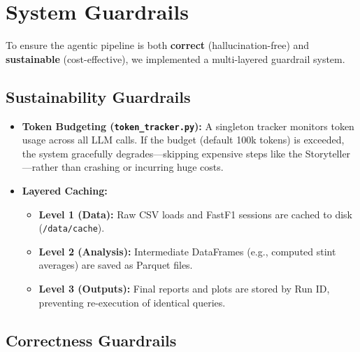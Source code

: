 \documentclass[11pt]{article}
\begin{document}
\section{System Guardrails}
\label{sec:guardrails}

To ensure the agentic pipeline is both \textbf{correct} (hallucination-free) and \textbf{sustainable} (cost-effective), we implemented a multi-layered guardrail system.

\subsection{Sustainability Guardrails}

\begin{itemize}[leftmargin=1.5em]
    \item \textbf{Token Budgeting (\texttt{token\_tracker.py}):} A singleton tracker monitors token usage across all LLM calls. If the budget (default 100k tokens) is exceeded, the system gracefully degrades—skipping expensive steps like the Storyteller—rather than crashing or incurring huge costs.
    \item \textbf{Layered Caching:}
    \begin{itemize}
        \item \textbf{Level 1 (Data):} Raw CSV loads and FastF1 sessions are cached to disk (\texttt{/data/cache}).
        \item \textbf{Level 2 (Analysis):} Intermediate DataFrames (e.g., computed stint averages) are saved as Parquet files.
        \item \textbf{Level 3 (Outputs):} Final reports and plots are stored by Run ID, preventing re-execution of identical queries.
    \end{itemize}
\end{itemize}

\subsection{Correctness Guardrails}
\end{document}
